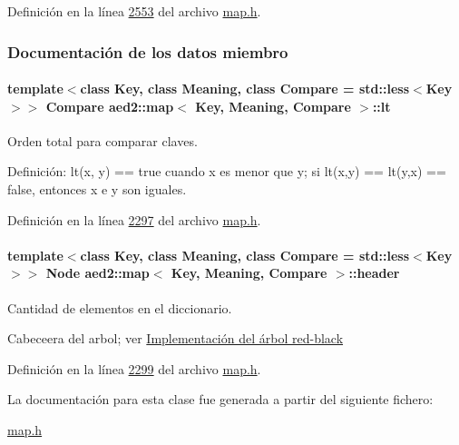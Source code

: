 \-Definición en la línea \hyperlink{map_8h_source_l02553}{2553} del archivo \hyperlink{map_8h_source}{map.\-h}.



\subsubsection{\-Documentación de los datos miembro}
\hypertarget{classaed2_1_1map_a0e5be36fae0693e4665bd2a615e7550a_a0e5be36fae0693e4665bd2a615e7550a}{
\paragraph[{lt}]{\setlength{\rightskip}{0pt plus 5cm}template$<$class \-Key, class \-Meaning, class \-Compare = std\-::less$<$\-Key$>$$>$ \-Compare {\bf aed2\-::map}$<$ \-Key, \-Meaning, \-Compare $>$\-::{\bf lt}}}\label{classaed2_1_1map_a0e5be36fae0693e4665bd2a615e7550a_a0e5be36fae0693e4665bd2a615e7550a}


\-Orden total para comparar claves. 

\-Definición\-: lt(x, y) == true cuando x es menor que y; si lt(x,y) == lt(y,x) == false, entonces x e y son iguales. 

\-Definición en la línea \hyperlink{map_8h_source_l02297}{2297} del archivo \hyperlink{map_8h_source}{map.\-h}.

\hypertarget{classaed2_1_1map_a92d93f905c8ad73fba18fdc7e8915cce_a92d93f905c8ad73fba18fdc7e8915cce}{
\paragraph[{header}]{\setlength{\rightskip}{0pt plus 5cm}template$<$class \-Key, class \-Meaning, class \-Compare = std\-::less$<$\-Key$>$$>$ {\bf \-Node} {\bf aed2\-::map}$<$ \-Key, \-Meaning, \-Compare $>$\-::{\bf header}}}\label{classaed2_1_1map_a92d93f905c8ad73fba18fdc7e8915cce_a92d93f905c8ad73fba18fdc7e8915cce}


\-Cantidad de elementos en el diccionario. 

\-Cabeceera del arbol; ver \hyperlink{Implementacion}{\-Implementación del árbol red-\/black} 

\-Definición en la línea \hyperlink{map_8h_source_l02299}{2299} del archivo \hyperlink{map_8h_source}{map.\-h}.



\-La documentación para esta clase fue generada a partir del siguiente fichero\-:\begin{DoxyCompactItemize}
\item 
\hyperlink{map_8h}{map.\-h}\end{DoxyCompactItemize}
